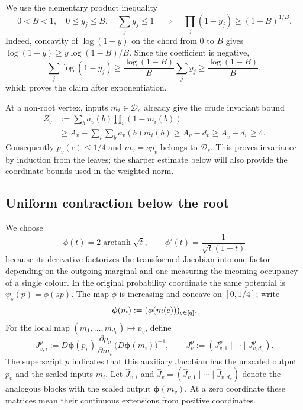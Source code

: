 We use the elementary product inequality
\begin{equation}
  0<B<1,\quad 0\le y_j\le B,\quad \sum_jy_j\le1
  \quad\Longrightarrow\quad
  \prod_j(1-y_j)\ge(1-B)^{1/B}.
  \label{eq:hg-product-lemma}
\end{equation}
Indeed, concavity of $\log(1-y)$ on the chord from $0$ to $B$ gives
$\log(1-y)\ge y\log(1-B)/B$.  Since the coefficient is negative,
\[
 \sum_j\log(1-y_j)
 \ge\frac{\log(1-B)}B\sum_jy_j
 \ge\frac{\log(1-B)}B,
\]
which proves the claim after exponentiation.

At a non-root vertex, inputs
\(m_i\in\mathcal D_s\) already give the crude invariant bound
\begin{equation}
\begin{aligned}
 Z_v
 &:=\sum_b a_v(b)\prod_i(1-m_i(b))\\
 &\ge A_v-\sum_i\sum_b a_v(b)m_i(b)
 \ge A_v-d_v\ge\underline A_v-d_v\ge4.
\end{aligned}
\label{eq:hg-Z-four}
\end{equation}
Consequently \(p_v(c)\le1/4\) and \(m_v=sp_v\) belongs to
\(\mathcal D_s\).  This proves invariance by induction from the leaves;
the sharper estimate below will also provide the coordinate bounds used in
the weighted norm.

\subsection{Uniform contraction below the root}
\label{sec:hg-nonroot-contraction}

We choose
\begin{equation}
  \phi(t)=2\operatorname{arctanh}\sqrt t,
  \qquad
  \phi'(t)=\frac1{\sqrt t(1-t)}
  \label{eq:hg-potential}
\end{equation}
because its derivative factorizes the transformed Jacobian into one factor
depending on the outgoing marginal and one measuring the incoming occupancy
of a single colour.  In the original probability coordinate the same
potential is \(\psi_s(p)=\phi(sp)\).  The map \(\phi\) is
increasing and concave on \([0,1/4]\); write
\[
  \boldsymbol\phi(m):=(\phi(m(c)))_{c\in[q]}.
\]
For the local map \((m_1,\ldots,m_{d_v})\mapsto p_v\), define
\[
 J^p_{v,i}
 :=D\boldsymbol\phi(p_v)\,
     \frac{\partial p_v}{\partial m_i}\,
     \bigl(D\boldsymbol\phi(m_i)\bigr)^{-1},
 \qquad
 J^p_v:=(J^p_{v,1}\mid\cdots\mid J^p_{v,d_v}).
\]
The superscript \(p\) indicates that this auxiliary Jacobian has the
unscaled output \(p_v\) and the scaled inputs \(m_i\).
Let \(\widehat J_{v,i}\) and
\(\widehat J_v=(\widehat J_{v,1}\mid\cdots\mid\widehat J_{v,d_v})\)
denote the analogous blocks with the scaled output \(\boldsymbol\phi(m_v)\).  At a zero
coordinate these matrices mean their continuous extensions from positive
coordinates.

